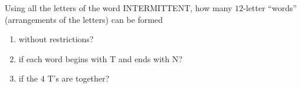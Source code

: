Using all the letters of the word INTERMITTENT, how many $12$-letter ``words'' (arrangements of the letters) can be formed
\begin{enumerate}
\item[(a)] without restrictions?
\item[(b)] if each word begins with T and ends with N?
\item[(c)] if the $4$ T's are together?
\end{enumerate}
